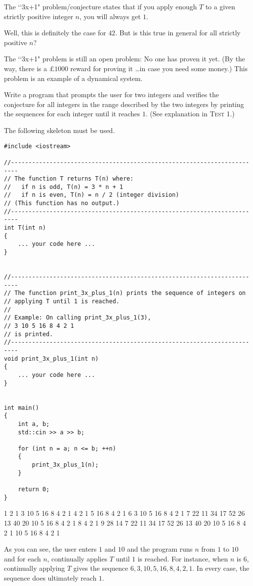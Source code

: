 The \lq\lq 3x+1" problem/conjecture states that if you apply enough $T$ to a
given strictly positive integer $n$, you will always get $1$.

Well, this is definitely the case for $42$. But is this true in general for
all strictly positive $n$?

The \lq\lq 3x+1" problem is still an open problem: No one has proven it yet.
(By the way, there is a \pounds$1000$ reward for proving it \dots in case you
need some money.) This problem is an example of a dynamical system.

Write a program that prompts the user for two integers and verifies the
conjecture for all integers in the range described by the two integers by
printing the sequences for each integer until it reaches $1$. (See explanation
in \textsc{Test 1}.)

The following skeleton must be used. 
\begin{Verbatim}[frame=single]
#include <iostream>

//------------------------------------------------------------------------
// The function T returns T(n) where:
//   if n is odd, T(n) = 3 * n + 1
//   if n is even, T(n) = n / 2 (integer division)
// (This function has no output.)
//------------------------------------------------------------------------
int T(int n)
{
    ... your code here ...
}


//------------------------------------------------------------------------
// The function print_3x_plus_1(n) prints the sequence of integers on
// applying T until 1 is reached.
// 
// Example: On calling print_3x_plus_1(3),
// 3 10 5 16 8 4 2 1
// is printed. 
//------------------------------------------------------------------------
void print_3x_plus_1(int n)
{
    ... your code here ...
}


int main()
{
    int a, b;
    std::cin >> a >> b;
    
    for (int n = a; n <= b; ++n)
    {
        print_3x_plus_1(n); 
    }

    return 0;
}
\end{Verbatim}


\resett
\nextt
\begin{console}[frame=single, commandchars=\\\{\}]
1
2 1
3 10 5 16 8 4 2 1
4 2 1
5 16 8 4 2 1
6 3 10 5 16 8 4 2 1
7 22 11 34 17 52 26 13 40 20 10 5 16 8 4 2 1
8 4 2 1
9 28 14 7 22 11 34 17 52 26 13 40 20 10 5 16 8 4 2 1
10 5 16 8 4 2 1
\end{console}
As you can see, the user enters $1$ and $10$ and the program runs $n$ from $1$
to $10$ and for each $n$, continually applies $T$ until $1$ is reached. For
instance, when $n$ is $6$, continually applying $T$ gives the sequence
$6, 3, 10, 5, 16, 8, 4, 2, 1$. In every case, the sequence does ultimately
reach $1$.

